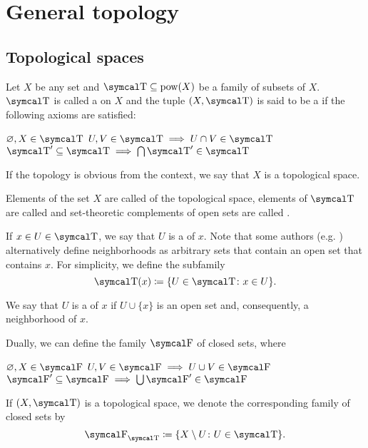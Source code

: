 \section{General topology}\label{sec:general_topology}
\subsection{Topological spaces}\label{subsec:topological_spaces}

\begin{definition}\label{def:topological_space}
  Let \( X \) be any set and \( \CT \subseteq \Pow(X) \) be a family of subsets of \( X \). \( \CT \) is called a  on \( X \) and the tuple \( (X, \CT) \) is said to be a  if the following axioms are satisfied:
  \begin{DefEnum}
     \( \varnothing, X \in \CT \)
     \( U, V \in \CT \implies U \cap V \in \CT \)
     \( \CT' \subseteq \CT \implies \bigcap \CT' \in \CT \)
  \end{DefEnum}

  If the topology is obvious from the context, we say that \( X \) is a topological space.

  Elements of the set \( X \) are called  of the topological space, elements of \( \CT \) are called  and set-theoretic complements of open sets are called .

  If \( x \in U \in \CT \), we say that \( U \) is a  of \( x \). Note that some authors (e.g. \cite[38]{Kelley1955}) alternatively define neighborhoods as arbitrary sets that contain an open set that contains \( x \). For simplicity, we define the subfamily
  \begin{equation*}
    \CT(x) \coloneqq \{ U \in \CT \colon x \in U \}.
  \end{equation*}

  We say that \( U \) is a  of \( x \) if \( U \cup \{ x \} \) is an open set and, consequently, a neighborhood of \( x \).

  Dually, we can define the family \( \CF \) of closed sets, where
  \begin{DefEnum}
     \( \varnothing, X \in \CF \)
     \( U, V \in \CF \implies U \cup V \in \CF \)
     \( \CF' \subseteq \CF \implies \bigcup \CF' \in \CF \)
  \end{DefEnum}

  If \( (X, \CT) \) is a topological space, we denote the corresponding family of closed sets by
  \begin{equation*}
    \CF_{\CT} \coloneqq \{ X \setminus U \colon U \in \CT \}.
  \end{equation*}
\end{definition}

